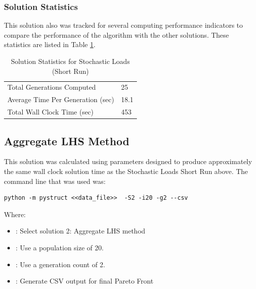 \subsubsection{Solution Statistics}
This solution also was tracked for several computing performance indicators to compare the performance of the algorithm with the other solutions. These statistics are listed in Table \ref{tab:stat_sto_short}. 

\begin{table}[!htbp]
	\caption{Solution Statistics for Stochastic Loads (Short Run)}
  \label{tab:stat_sto_short}
  \centering
  \begin{tabular}{|l|l|}
    \hline
	  Total Generations Computed & 25\\
    Average Time Per Generation (sec) & 18.1\\
    Total Wall Clock Time (sec)	 & 453\\
    \hline
  \end{tabular}
\end{table}

\subsection{Aggregate LHS Method}
This solution was calculated using parameters designed to produce approximately the same wall clock solution time as the Stochastic Loads Short Run above. The command line that was used was:

\begin{verbatim}
python -m pystruct <<data_file>>  -S2 -i20 -g2 --csv
\end{verbatim}

\noindent Where: 

\begin{itemize}
  \item {}: Select solution 2: Aggregate LHS method
  \item {}: Use a population size of 20. 
  \item {}: Use a generation count of 2. 
  \item {}: Generate CSV output for final Pareto Front
\end{itemize}


